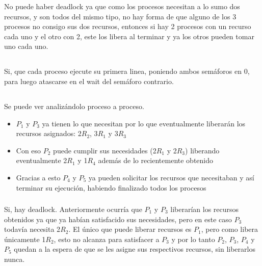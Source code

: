 No puede haber deadlock ya que como los procesos necesitan a lo sumo dos
recursos, y son todos del mismo tipo, no hay forma de que alguno de los 3
procesos no consigo sus dos recursos, entonces si hay 2 procesos con un
recurso cada uno y el otro con 2, este los libera al terminar y ya los otros
pueden tomar uno cada uno.

\subsection{}

\subsubsection{}

Si, que cada proceso ejecute su primera linea, poniendo ambos semáforos en 0,
para luego atascarse en el wait del semáforo contrario.

\subsection{}

Se puede ver analizándolo proceso a proceso.

\begin{itemize}
\item $P_1$ y $P_3$ ya tienen lo que necesitan por lo que eventualmente
liberarán los recursos asignados: 2$R_2$, 3$R_1$ y 3$R_3$
\item Con eso $P_2$ puede cumplir sus necesidades (2$R_1$ y 2$R_3$) liberando
eventualmente 2$R_1$ y 1$R_4$ además de lo recientemente obtenido
\item Gracias a esto $P_4$ y $P_5$ ya pueden solicitar los recursos que
necesitaban y así terminar su ejecución, habiendo finalizado todos los
procesos
\end{itemize}

\subsubsection{}

Si, hay deadlock. Anteriormente ocurría que $P_1$ y $P_3$ liberarían los
recursos obtenidos ya que ya habían satisfacido sus necesidades, pero en este
caso $P_3$ todavía necesita 2$R_2$. El único que puede liberar recursos es
$P_1$, pero como libera únicamente 1$R_2$, esto no alcanza para satisfacer a
$P_3$ y por lo tanto $P_2$, $P_3$, $P_4$ y $P_5$ quedan a la espera de que se
les asigne sus respectivos recursos, sin liberarlos nunca.

